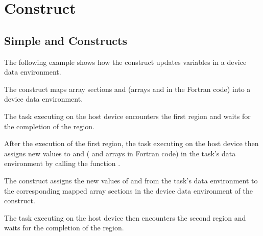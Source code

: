 \section{ Construct}
\label{sec:target_update}

\subsection{Simple  and  Constructs}
\label{subsec:target_data_and_update}

The following example shows how the  construct updates 
variables in a device data environment.

The  construct maps array sections  and  
(arrays  and  in the Fortran code) into a device data environment.

The task executing on the host device encounters the first  region 
and waits for the completion of the region.

After the execution of the first  region, the task executing on 
the host device then assigns new values to  and  ( and  arrays 
in Fortran code) in the task's data environment by calling the function .

The  construct assigns the new values of  and
 from the task's data environment to the corresponding mapped array sections 
in the device data environment of the  construct.

The task executing on the host device then encounters the second  
region and waits for the completion of the region.


